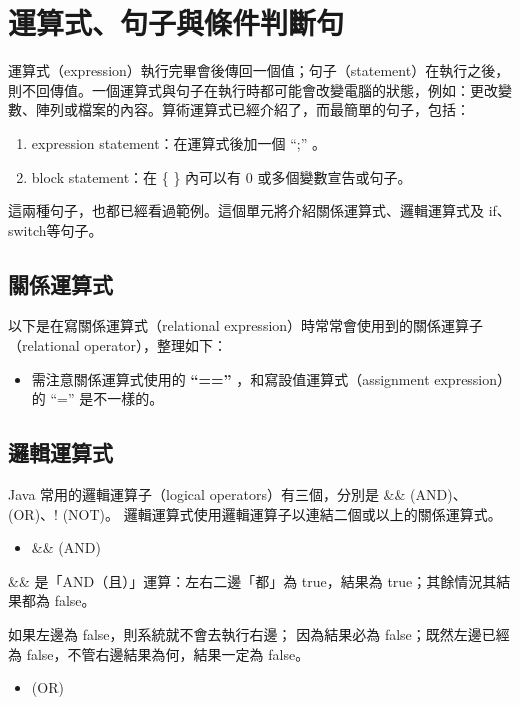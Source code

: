 \documentclass[a4paper,12pt,english]{sphinxmanual}
\begin{document}
\chapter{運算式、句子與條件判斷句}
\label{java_cond::doc}\label{java_cond:id1}
運算式（expression）執行完畢會後傳回一個值；句子（statement）在執行之後，則不回傳值。一個運算式與句子在執行時都可能會改變電腦的狀態，例如：更改變數、陣列或檔案的內容。算術運算式已經介紹了，而最簡單的句子，包括：
\begin{enumerate}
\item {} 
expression statement：在運算式後加一個 ``;'' 。

\item {} 
block statement：在 \{ \} 內可以有 0 或多個變數宣告或句子。

\end{enumerate}

這兩種句子，也都已經看過範例。這個單元將介紹關係運算式、邏輯運算式及 if、switch等句子。


\section{關係運算式}
\label{java_cond:id2}
以下是在寫關係運算式（relational expression）時常常會使用到的關係運算子（relational operator），整理如下：
\begin{itemize}
\item {} 
需注意關係運算式使用的  \textbf{``==''}  ，和寫設值運算式（assignment expression）的 ``='' 是不一樣的。

\end{itemize}


\section{邏輯運算式}
\label{java_cond:id3}
Java 常用的邏輯運算子（logical operators）有三個，分別是 \&\& (AND)、\textbar{}\textbar{} (OR)、! (NOT)。
邏輯運算式使用邏輯運算子以連結二個或以上的關係運算式。
\begin{itemize}
\item {} 
\&\& (AND)

\end{itemize}

\&\& 是「AND（且）」運算：左右二邊「都」為 true，結果為 true；其餘情況其結果都為 false。

如果左邊為 false，則系統就不會去執行右邊；
因為結果必為 false；既然左邊已經為 false，不管右邊結果為何，結果一定為 false。
\begin{itemize}
\item {} 
\textbar{}\textbar{} (OR)

\end{itemize}
\end{document}
